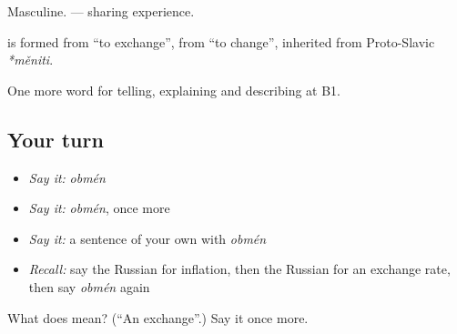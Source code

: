 Masculine. \emph{ } — sharing experience.

\begin{cousinweb}
\textbf{} is formed from \emph{} \textquotedblleft{}to exchange\textquotedblright{}, from \emph{} \textquotedblleft{}to change\textquotedblright{}, inherited from Proto-Slavic \emph{*měniti}.
\end{cousinweb}

\begin{grammarlens}[title={What you've built}]
One more word for telling, explaining and describing at B1.
\end{grammarlens}

\subsection*{Your turn}
\begin{itemize}
\raggedright
  \item \emph{Say it:} \emph{obmén}
  \item \emph{Say it:} \emph{obmén}, once more
  \item \emph{Say it:} a sentence of your own with \emph{obmén}
  \item \emph{Recall:} say the Russian for inflation, then the Russian for an exchange rate, then say \emph{obmén} again
\end{itemize}

\begin{tcolorbox}[breakable,colback=teal!4,colframe=teal!35!black,title={Before you move on}]
What does  mean? (\textquotedblleft{}An exchange\textquotedblright{}.) Say it once more.
\end{tcolorbox}

